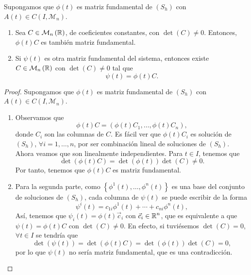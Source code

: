 \begin{prop}
	Supongamos que $\displaystyle \phi\left(t\right) $ es matriz fundamental de $\displaystyle \left(S_{h}\right) $ con $\displaystyle A\left(t\right)\in C\left(I, \mathcal{M}_{n}\right) $.
	\begin{enumerate}
	\item Sea $\displaystyle C \in \mathcal{M}_{n}\left(\mathbb{R}\right) $, de coeficientes constantes, con $\displaystyle \det\left(C\right)\neq0 $. Entonces, $\displaystyle \phi\left(t\right)C $ es también matriz fundamental.
	\item Si $\displaystyle \psi\left(t\right) $ es otra matriz fundamental del sistema, entonces existe $\displaystyle C \in \mathcal{M}_{n}\left(\mathbb{R}\right) $ con $\displaystyle \det\left(C\right)\neq 0 $ tal que 
	\[\psi\left(t\right)=\phi\left(t\right)C .\]
	\end{enumerate}
\end{prop}
\begin{proof} Supongamos que $\displaystyle \phi\left(t\right) $ es matriz fundamental de $\displaystyle \left(S_{h}\right) $ con $\displaystyle A\left(t\right)\in C\left(I, \mathcal{M}_{n}\right) $. 
\begin{enumerate}
\item Observamos que 
\[\phi\left(t\right)C = \left(\phi\left(t\right)C_{1}, \ldots, \phi\left(t\right)C_{n}\right) ,\]
donde $\displaystyle C_{i} $ son las columnas de $\displaystyle C $. Es fácil ver que $\displaystyle \phi\left(t\right)C_{i} $ es solución de $\displaystyle \left(S_{h}\right) $, $\displaystyle \forall i = 1, \ldots, n $, por ser combinación lineal de soluciones de $\displaystyle \left(S_{h}\right) $.
Ahora veamos que son linealmente independientes. Para $\displaystyle t \in I $, tenemos que 
\[\det\left(\phi\left(t\right)C\right)=\det\left(\phi\left(t\right)\right)\det\left(C\right)\neq 0 .\]
Por tanto, tenemos que $\displaystyle \phi\left(t\right)C $ es matriz fundamental.
\item Para la segunda parte, como $\displaystyle \left\{ \phi^{1}\left(t\right), \ldots, \phi^{n}\left(t\right)\right\}  $ es una base del conjunto de soluciones de $\displaystyle \left(S_{h}\right) $, cada columna de $\displaystyle \psi\left(t\right) $ se puede escribir de la forma
\[\psi^{i}\left(t\right)=c_{1i}\phi^{1}\left(t\right)+ \cdots + c_{ni}\phi^{n}\left(t\right) ,\]
Así, tenemos que $\displaystyle \psi_{i}\left(t\right)=\phi\left(t\right)\vec{c}_{i} $ con $\displaystyle \vec{c}_{i}\in \mathbb{R}^{n} $, que es equivalente a que $\displaystyle \psi\left(t\right)=\phi\left(t\right)C $ con $\displaystyle \det\left(C\right)\neq 0 $. En efecto, si tuviésemos $\displaystyle \det\left(C\right)=0 $, $\displaystyle \forall t \in I $ se tendría que
\[\det\left(\psi\left(t\right)\right)=\det\left(\phi\left(t\right)C\right)=\det\left(\phi\left(t\right)\right)\det\left(C\right)=0,\]
por lo que $\displaystyle \psi\left(t\right) $ no sería matriz fundamental, que es una contradicción. 
\end{enumerate}
\end{proof}

